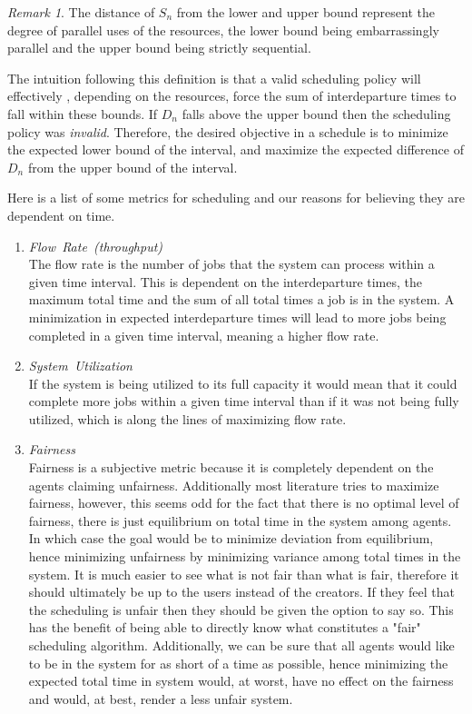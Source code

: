 \documentclass{article}
\theoremstyle{definition}
\theoremstyle{remark}
\newtheorem*{remark}{Remark}
\begin{document}
		\begin{remark}
			The distance of $S_{n}$ from the lower and upper bound represent the degree of parallel uses of the resources, the lower bound being embarrassingly parallel and the upper bound being strictly sequential.
		\end{remark}
				
		The intuition following this definition is that a valid scheduling policy will effectively , depending on the resources, force the sum of interdeparture times to fall within these bounds. If $D_{n}$ falls above the upper bound then the scheduling policy was \emph{invalid}. Therefore, the desired objective in a schedule is to minimize the expected lower bound of the interval, and maximize the expected difference of $D_{n}$ from the upper bound of the interval.
		
		Here is a list of some metrics for scheduling and our reasons for believing they are dependent on time.
		\flushleft 
		\begin{enumerate}
			\item[(1)] \mbox{\emph{Flow Rate (throughput)}} \\
			The flow rate is the number of jobs that the system can process within a given time interval. This is dependent on the interdeparture times, the maximum total time and the sum of all total times a job is in the system. A minimization in expected interdeparture times will lead to more jobs being completed in a given time interval, meaning a higher flow rate.
			\item[(2)] \mbox{\emph{System Utilization}} \\
			If the system is being utilized to its full capacity it would mean that it could complete more jobs within a given time interval than if it was not being fully utilized, which is along the lines of maximizing flow rate.
			\item[(3)] \mbox{\emph{Fairness}} \\
			Fairness is a subjective metric because it is completely dependent on the agents claiming unfairness. Additionally most literature tries to maximize fairness, however, this seems odd for the fact that there is no optimal level of fairness, there is just equilibrium on total time in the system among agents. In which case the goal would be to minimize deviation from equilibrium, hence minimizing unfairness by minimizing variance among total times in the system. It is much easier to see what is not fair than what is fair, therefore it should ultimately be up to the users instead of the creators. If they feel that the scheduling is unfair then they should be given the option to say so. This has the benefit of being able to directly know what constitutes a "fair" scheduling algorithm. Additionally, we can be sure that all agents would like to be in the system for as short of a time as possible, hence minimizing the expected total time in system would, at worst, have no effect on the fairness and would, at best, render a less unfair system.
		\end{enumerate}
	
\end{document}
